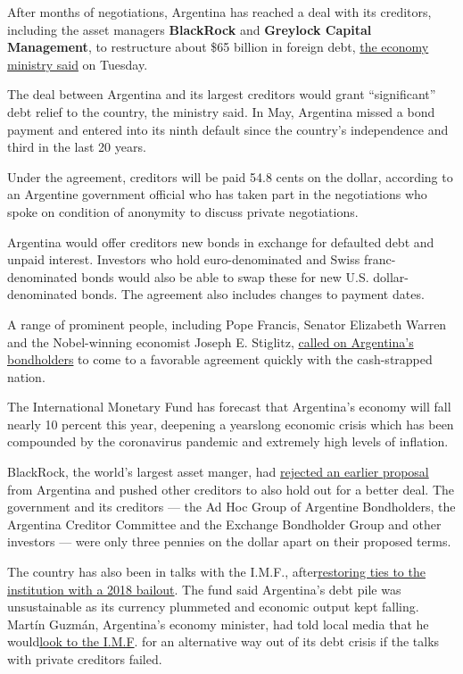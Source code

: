 After months of negotiations, Argentina has reached a deal with its
creditors, including the asset managers \textbf{BlackRock} and
\textbf{Greylock Capital Management}, to restructure about \$65 billion
in foreign debt,
\href{https://www.economia.gob.ar/en/argentina-and-three-creditor-groups-reach-a-deal-on-debt-restructuring/}{the
economy ministry said} on Tuesday.

The deal between Argentina and its largest creditors would grant
``significant'' debt relief to the country, the ministry said. In May,
Argentina missed a bond payment and entered into its ninth default since
the country's independence and third in the last 20 years.

Under the agreement, creditors will be paid 54.8 cents on the dollar,
according to an Argentine government official who has taken part in the
negotiations who spoke on condition of anonymity to discuss private
negotiations.

Argentina would offer creditors new bonds in exchange for defaulted debt
and unpaid interest. Investors who hold euro-denominated and Swiss
franc-denominated bonds would also be able to swap these for new U.S.
dollar-denominated bonds. The agreement also includes changes to payment
dates.

A range of prominent people, including Pope Francis, Senator Elizabeth
Warren and the Nobel-winning economist Joseph E. Stiglitz,
\href{https://www.nytimes.com/2020/05/22/world/americas/argentina-default.html}{called
on Argentina's bondholders} to come to a favorable agreement quickly
with the cash-strapped nation.

The International Monetary Fund has forecast that Argentina's economy
will fall nearly 10 percent this year, deepening a yearslong economic
crisis which has been compounded by the coronavirus pandemic and
extremely high levels of inflation.

BlackRock, the world's largest asset manger, had
\href{https://www.nytimes.com/2020/07/31/business/argentina-debt.html}{rejected
an earlier proposal} from Argentina and pushed other creditors to also
hold out for a better deal. The government and its creditors --- the Ad
Hoc Group of Argentine Bondholders, the Argentina Creditor Committee and
the Exchange Bondholder Group and other investors --- were only three
pennies on the dollar apart on their proposed terms.

The country has also been in talks with the I.M.F.,
after\href{https://qz.com/1274875/how-argentina-went-from-selling-100-year-bonds-to-an-imf-rescue-in-a-matter-of-months/}{restoring
ties to the institution with a 2018 bailout}. The fund said Argentina's
debt pile was unsustainable as its currency plummeted and economic
output kept falling. Martín Guzmán, Argentina's economy minister, had
told local media that he
would\href{https://www.pagina12.com.ar/282488-deuda-la-ultima-oferta-y-el-mensaje-de-martin-guzman}{look
to the I.M.F}. for an alternative way out of its debt crisis if the
talks with private creditors failed.

